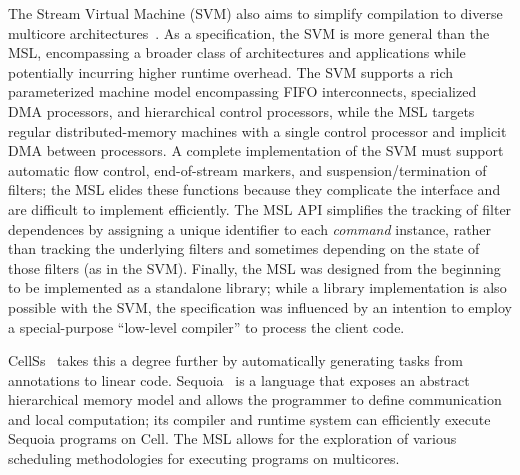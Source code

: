 The Stream Virtual Machine (SVM) also aims to simplify compilation to
diverse multicore architectures~\cite{svm:specs,svm}.  As a specification,
the SVM is more general than the MSL, encompassing a broader class of
architectures and applications while potentially incurring higher
runtime overhead.  The SVM supports a rich parameterized machine model
encompassing FIFO interconnects, specialized DMA processors, and
hierarchical control processors, while the MSL targets regular
distributed-memory machines with a single control processor and
implicit DMA between processors.  A complete implementation of the SVM
must support automatic flow control, end-of-stream markers, and
suspension/termination of filters; the MSL elides these functions
because they complicate the interface and are difficult to implement
efficiently.  The MSL API simplifies the tracking of filter
dependences by assigning a unique identifier to each {\it command}
instance, rather than tracking the underlying filters and sometimes
depending on the state of those filters (as in the SVM).  Finally, the
MSL was designed from the beginning to be implemented as a standalone
library; while a library implementation is also possible with the SVM,
the specification was influenced by an intention to employ a
special-purpose ``low-level compiler'' to process the client code.

CellSs~\cite{cellss} takes
this a degree further by automatically generating tasks from
annotations to linear code. Sequoia~\cite{sequoia} is a language that exposes an abstract hierarchical memory model and allows the programmer to define communication and local computation; its compiler and runtime system can efficiently execute Sequoia programs on Cell. The MSL allows for the exploration of
various scheduling methodologies for executing programs on multicores.

